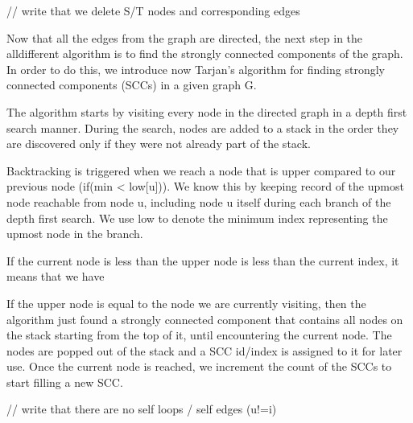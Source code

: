 \documentclass{l4proj}
\begin{document}
// write that we delete S/T nodes and corresponding edges

Now that all the edges from the graph are directed, the next step in the alldifferent algorithm is to find the strongly connected components of the graph. In order to do this, we introduce now Tarjan’s algorithm for finding strongly connected components  (SCCs) in a given graph G.

The algorithm starts by visiting every node in the directed graph in a depth first search manner. During the search, nodes are added to a stack in the order they are discovered only if they were not already part of the stack. 

Backtracking is triggered when we reach a node that is upper compared to our previous node (if(min < low[u])).  We know this by keeping record of the upmost node reachable from node u, including node u itself during each branch of the depth first search. We use low to denote the minimum index representing the upmost node in the branch.

If the current node is less than the upper node is less than the current index, it means that we have 

If the upper node is equal to the node we are currently visiting, then the algorithm just found a strongly connected component that contains all nodes on the stack starting from the top of it, until encountering the current node. The nodes are popped out of the stack and a SCC id/index is assigned to it for later use. Once the current node is reached, we increment the count of the SCCs to start filling a new SCC.

// write that there are no self loops / self edges (u!=i)
\cite{tarjan1972depth}
\end{document}
